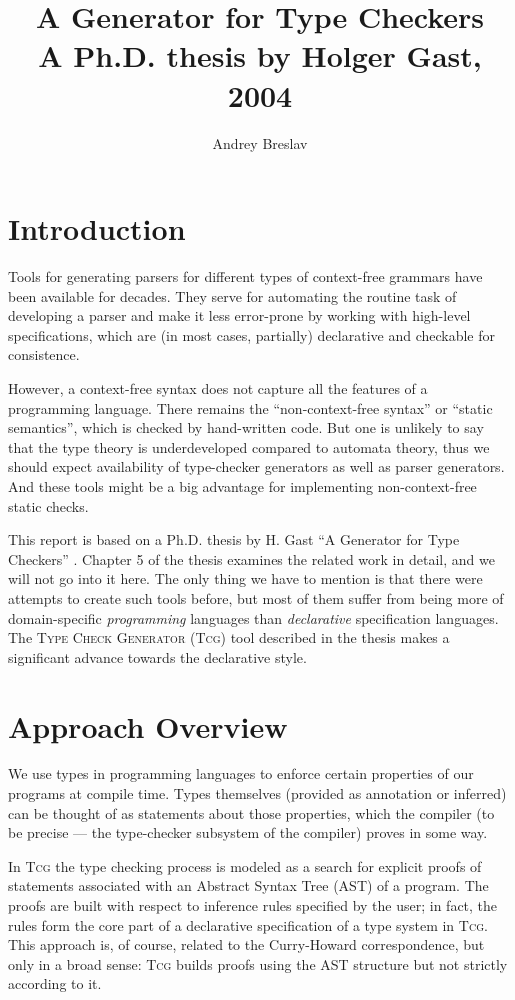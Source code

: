 \documentclass[a4paper,12pt]{article}
\title{A Generator for Type Checkers\\ \small{A Ph.D. thesis by Holger Gast, 2004}}
\author{Andrey Breslav}
\newcommand{\Tcg}{\textsc{Tcg}}
\begin{document}
\maketitle

\section{Introduction}

Tools for generating parsers for different types of context-free grammars have been available for decades. They serve for automating the routine task of developing a parser and make it less error-prone by working with high-level specifications, which are (in most cases, partially) declarative and checkable for consistence.

However, a context-free syntax does not capture all the features of a programming language. There remains the ``non-context-free syntax'' or ``static semantics'', which is checked by hand-written code. But one is unlikely to say that the type theory is underdeveloped compared to automata theory, thus we should expect availability of type-checker generators as well as parser generators. And these tools might be a big advantage for implementing non-context-free static checks.

This report is based on a Ph.D. thesis by H. Gast ``A Generator for Type Checkers'' \cite{Tcg}. Chapter 5 of the thesis examines the related work in detail, and we will not go into it here. The only thing we have to mention is that there were attempts to create such tools before, but most of them suffer from being more of domain-specific \emph{programming} languages than \emph{declarative} specification languages. The \textsc{Type Check Generator} (\Tcg{}) tool described in the thesis makes a significant advance towards the declarative style.



\section{Approach Overview}

We use types in programming languages to enforce certain properties of our programs at compile time. Types themselves (provided as annotation or inferred) can be thought of as statements about those properties, which the compiler (to be precise --- the type-checker subsystem of the compiler) proves in some way.

In \Tcg{} the type checking process is modeled as a search for explicit proofs of statements associated with an Abstract Syntax Tree (AST) of a program. The proofs are built with respect to inference rules specified by the user; in fact, the rules form the core part of a declarative specification of a type system in \Tcg{}. This approach is, of course, related to the Curry-Howard correspondence, but only in a broad sense: \Tcg{} builds proofs using the AST structure but not strictly according to it. 
\end{document}
